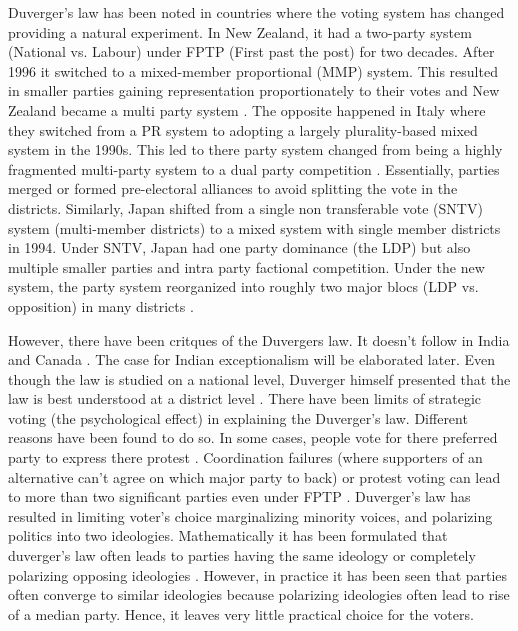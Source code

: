 Duverger's law has been noted in countries where the voting system has changed providing a natural experiment. In New Zealand, it had a two-party system (National vs. Labour) under FPTP (First past the post) for two decades. After 1996 it switched to a mixed-member proportional (MMP) system. This resulted in smaller parties gaining representation proportionately to their votes and New Zealand became a multi party system \citep{Eberhard_2017}. The opposite happened in Italy where they switched from a PR system to  adopting a largely plurality-based mixed system in the 1990s. This led to there party system changed from being a highly fragmented multi-party system to a dual party competition \citep{reed2001duverger}. Essentially, parties merged or formed pre-electoral alliances to avoid splitting the vote in the districts. Similarly,  Japan shifted from a single non transferable vote (SNTV) system (multi-member districts) to a mixed system with single member districts in 1994. Under SNTV, Japan had one party dominance (the LDP) but also multiple smaller parties and intra party factional competition. Under the new system, the party system reorganized into roughly two major blocs (LDP vs. opposition) in many districts \citep{reed2007duverger}. 

\vspace{0.3cm}

However, there have been critques of the Duvergers law. It doesn't follow in India and Canada \citep{gaines1999duverger}. The case for Indian exceptionalism will be elaborated later. Even though the law is studied on a national level, Duverger himself presented that the law is best understood at a district level \citep{diwakar2007duverger}. There have been limits of strategic voting (the psychological effect) in explaining the Duverger's law. Different reasons have been found to do so. In some cases, people vote for there preferred party to express there protest \citep{ziegfeld2021accounts}. Coordination failures (where supporters of an alternative can’t agree on which major party to back) or protest voting can lead to more than two significant parties even under FPTP \citep{singer2013duverger}. Duverger's law has resulted in limiting voter's choice marginalizing minority voices, and polarizing politics into two ideologies. Mathematically it has been formulated that duverger's law often leads to parties having the same ideology or completely polarizing opposing ideologies \citep{fey2007duverger}. However, in practice it has been seen that parties often converge to similar ideologies because polarizing ideologies often lead to rise of a median party. Hence, it leaves very little practical choice for the voters.

